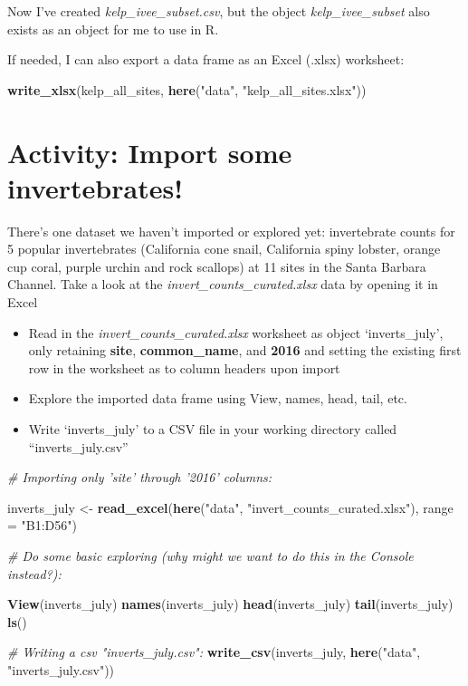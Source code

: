 \documentclass[]{book}
\newenvironment{Shaded}{\begin{snugshade}}{\end{snugshade}}
\newcommand{\CommentTok}[1]{\textcolor[rgb]{0.56,0.35,0.01}{\textit{#1}}}
\newcommand{\DataTypeTok}[1]{\textcolor[rgb]{0.13,0.29,0.53}{#1}}
\newcommand{\KeywordTok}[1]{\textcolor[rgb]{0.13,0.29,0.53}{\textbf{#1}}}
\newcommand{\NormalTok}[1]{#1}
\newcommand{\StringTok}[1]{\textcolor[rgb]{0.31,0.60,0.02}{#1}}
\providecommand{\tightlist}{%
  \setlength{\itemsep}{0pt}\setlength{\parskip}{0pt}}
\begin{document}
Now I've created \emph{kelp\_ivee\_subset.csv}, but the object \emph{kelp\_ivee\_subset} also exists as an object for me to use in R.

If needed, I can also export a data frame as an Excel (.xlsx) worksheet:

\begin{Shaded}
\begin{Highlighting}[]
\KeywordTok{write_xlsx}\NormalTok{(kelp_all_sites, }\KeywordTok{here}\NormalTok{(}\StringTok{"data"}\NormalTok{, }\StringTok{"kelp_all_sites.xlsx"}\NormalTok{))}
\end{Highlighting}
\end{Shaded}

\hypertarget{activity-import-some-invertebrates}{%
\section{Activity: Import some invertebrates!}\label{activity-import-some-invertebrates}}

There's one dataset we haven't imported or explored yet: invertebrate counts for 5 popular invertebrates (California cone snail, California spiny lobster, orange cup coral, purple urchin and rock scallops) at 11 sites in the Santa Barbara Channel. Take a look at the \emph{invert\_counts\_curated.xlsx} data by opening it in Excel

\begin{itemize}
\tightlist
\item
  Read in the \emph{invert\_counts\_curated.xlsx} worksheet as object `inverts\_july', only retaining \textbf{site}, \textbf{common\_name}, and \textbf{2016} and setting the existing first row in the worksheet as to column headers upon import
\item
  Explore the imported data frame using View, names, head, tail, etc.
\item
  Write `inverts\_july' to a CSV file in your working directory called ``inverts\_july.csv''
\end{itemize}

\begin{Shaded}
\begin{Highlighting}[]
\CommentTok{# Importing only 'site' through '2016' columns: }

\NormalTok{inverts_july <-}\StringTok{ }\KeywordTok{read_excel}\NormalTok{(}\KeywordTok{here}\NormalTok{(}\StringTok{"data"}\NormalTok{, }\StringTok{"invert_counts_curated.xlsx"}\NormalTok{), }\DataTypeTok{range =} \StringTok{"B1:D56"}\NormalTok{)}

\CommentTok{# Do some basic exploring (why might we want to do this in the Console instead?):}

\KeywordTok{View}\NormalTok{(inverts_july)}
\KeywordTok{names}\NormalTok{(inverts_july)}
\KeywordTok{head}\NormalTok{(inverts_july)}
\KeywordTok{tail}\NormalTok{(inverts_july)}
\KeywordTok{ls}\NormalTok{()}

\CommentTok{# Writing a csv "inverts_july.csv":}
\KeywordTok{write_csv}\NormalTok{(inverts_july, }\KeywordTok{here}\NormalTok{(}\StringTok{"data"}\NormalTok{, }\StringTok{"inverts_july.csv"}\NormalTok{))}
\end{Highlighting}
\end{Shaded}
\end{document}
